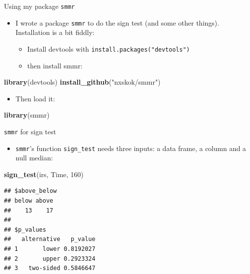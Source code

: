 \documentclass[ignorenonframetext,]{beamer}
\newenvironment{Shaded}{\begin{snugshade}}{\end{snugshade}}
\newcommand{\DecValTok}[1]{\textcolor[rgb]{0.00,0.00,0.81}{#1}}
\newcommand{\KeywordTok}[1]{\textcolor[rgb]{0.13,0.29,0.53}{\textbf{#1}}}
\newcommand{\NormalTok}[1]{#1}
\newcommand{\StringTok}[1]{\textcolor[rgb]{0.31,0.60,0.02}{#1}}
\providecommand{\tightlist}{%
  \setlength{\itemsep}{0pt}\setlength{\parskip}{0pt}}
\begin{document}
\begin{frame}[fragile]{Using my package \texttt{smmr}}
\protect\hypertarget{using-my-package-smmr}{}

\begin{itemize}
\tightlist
\item
  I wrote a package \texttt{smmr} to do the sign test (and some other
  things). Installation is a bit fiddly:

  \begin{itemize}
  \tightlist
  \item
    Install devtools with \texttt{install.packages("devtools")}
  \item
    then install smmr:
  \end{itemize}
\end{itemize}

\begin{Shaded}
\begin{Highlighting}[]
\KeywordTok{library}\NormalTok{(devtools)}
\KeywordTok{install_github}\NormalTok{(}\StringTok{"nxskok/smmr"}\NormalTok{)}
\end{Highlighting}
\end{Shaded}

\begin{itemize}
\tightlist
\item
  Then load it:
\end{itemize}

\begin{Shaded}
\begin{Highlighting}[]
\KeywordTok{library}\NormalTok{(smmr)}
\end{Highlighting}
\end{Shaded}

\end{frame}

\begin{frame}[fragile]{\texttt{smmr} for sign test}
\protect\hypertarget{smmr-for-sign-test}{}

\begin{itemize}
\tightlist
\item
  \texttt{smmr}'s function \texttt{sign\_test} needs three inputs: a
  data frame, a column and a null median:
\end{itemize}

\begin{Shaded}
\begin{Highlighting}[]
\KeywordTok{sign_test}\NormalTok{(irs, Time, }\DecValTok{160}\NormalTok{)}
\end{Highlighting}
\end{Shaded}

\begin{verbatim}
## $above_below
## below above 
##    13    17 
## 
## $p_values
##   alternative   p_value
## 1       lower 0.8192027
## 2       upper 0.2923324
## 3   two-sided 0.5846647
\end{verbatim}

\end{frame}
\end{document}
